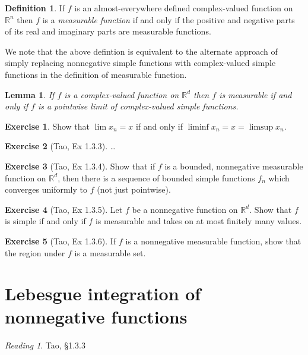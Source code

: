 \documentclass[10pt,oneside]{amsbook}
\newcommand{\RR}{{\mathbb R}}
\theoremstyle{definition}
\newtheorem{exerc}{Exercise}[section]
\theoremstyle{plain}
\newtheorem{lem}[thm]{Lemma}
\theoremstyle{definition}
\newtheorem{defn}[thm]{Definition}
\theoremstyle{remark}
\newtheorem*{reading}{Reading}
\numberwithin{equation}{section}
\numberwithin{figure}{section}
\begin{document}
\begin{defn}
  If $f$ is an almost-everywhere defined complex-valued function on $\RR^n$ then $f$ is a \emph{measurable function} if and only if the positive and negative parts of its real and imaginary parts are measurable functions.
\end{defn}

We note that the above defintion is equivalent to the alternate approach of simply replacing nonnegative simple functions with complex-valued simple functions in the definition of measurable function.

\begin{lem}
  If $f$ is a complex-valued function on $\RR^d$ then $f$ is measurable if and only if $f$ is a pointwise limit of complex-valued simple functions.
\end{lem}

\begin{exerc}
  Show that $\lim x_n=x$ if and only if $\liminf x_n=x=\limsup x_n$.
\end{exerc}

\begin{exerc}[Tao, Ex 1.3.3]
  \ldots
\end{exerc}

\begin{exerc}[Tao, Ex 1.3.4]
  Show that if $f$ is a bounded, nonnegative measurable function on $\RR^d$, then there is a sequence of bounded simple functions $f_n$ which converges uniformly to $f$ (not just pointwise).
\end{exerc}

\begin{exerc}[Tao, Ex 1.3.5]
  Let $f$ be a nonnegative function on $\RR^d$. Show that $f$ is simple if and only if $f$ is measurable and takes on at most finitely many values.
\end{exerc}

\begin{exerc}[Tao, Ex 1.3.6]
  If $f$ is a nonnegative measurable function, show that the region under $f$ is a measurable set.
\end{exerc}

\newpage
\section{Lebesgue integration of nonnegative functions}

\begin{reading}
  Tao, \S 1.3.3
\end{reading}
\end{document}

